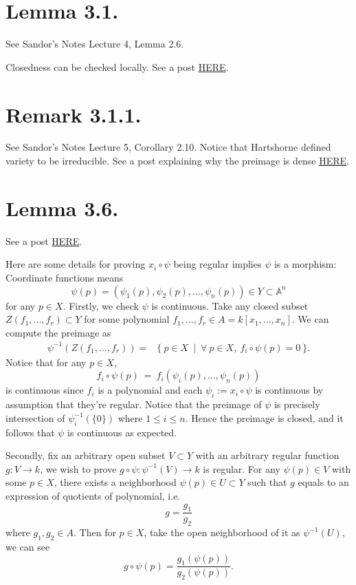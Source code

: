 \section{Lemma 3.1.}

See Sandor's Notes Lecture 4, Lemma 2.6.

Closedness can be checked locally. See a post \href{https://math.stackexchange.com/questions/717382/how-to-prove-that-z-is-closed-subset-iff-x-can-be-covered-by-open-subsets}{HERE}.

\section{Remark 3.1.1.}

See Sandor's Notes Lecture 5, Corollary 2.10.
Notice that Hartshorne defined variety to be irreducible.
See a post explaining why the preimage is dense \href{https://math.stackexchange.com/questions/2860498/regular-functions-are-determined-only-up-to-open-sets#:~:text=An%20important%20consequence%20of%20this,dense%2C%20hence%20equal%20to%20X.}{HERE}.

\section{Lemma 3.6.}

See a post \href{https://math.stackexchange.com/questions/457328/hartshorne-lemma-i-3-6}{HERE}.

Here are some details for proving $x_i\circ \psi$ being regular implies $\psi$ is a morphism:
Coordinate functions means 
\[\psi(p)=(\psi_1(p),\psi_2(p),...,\psi_n(p))\in Y\subset \mathbb A^n\] for any $p\in X$.
Firstly, we check $\psi$ is continuous. Take any closed subset $Z(f_1,...,f_r)\subset Y$ for some polynomial $f_1,...,f_r\in A=k[x_1,...,x_n]$. We can compute the preimage as \begin{align*}
    \psi^{-1}(Z(f_1,...,f_r)) =& \{~ p\in X ~\mid ~\forall~ p\in X,~ f_i\circ \psi(p)=0 ~\}.
\end{align*}
Notice that for any $p\in X$, \[f_i\circ \psi(p) ~=~ f_i(\psi_i(p),...,\psi_n(p))\] is continuous since $f_i$ is a polynomial and each $\psi_i:=x_i\circ \psi$ is continuous by assumption that they're regular.
Notice that the preimage of $\psi$ is precisely intersection of $\psi_i^{-1}(\{0\})$ where $1\leq i\leq n$. Hence the preimage is closed, and it follows that $\psi$ is continuous as expected. 

Secondly, fix an arbitrary open subset $V\subset Y$ with an arbitrary regular function $g:V\to k$, we wish to prove $g\circ \psi:\psi^{-1}(V)\to k$ is regular. For any $\psi(p)\in V$ with some $p\in X$, there exists a neighborhood $\psi(p)\in U\subset Y$ such that $g$ equals to an expression of quotients of polynomial, i.e. \[g=\frac{g_1}{g_2}\] where $g_1,g_2\in A$. Then for $p\in X$, take the open neighborhood of it as $\psi^{-1}(U)$, we can see 
\[g\circ \psi (p) = \frac{g_1(\psi(p))}{g_2(\psi(p))}.\]